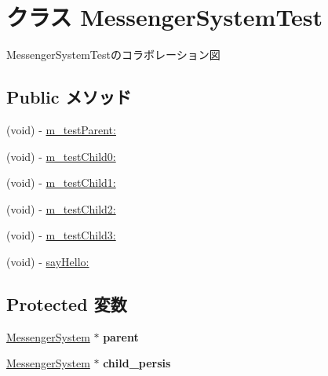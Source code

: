 \hypertarget{interface_messenger_system_test}{
\section{クラス MessengerSystemTest}
\label{d9/d39/interface_messenger_system_test}
}


MessengerSystemTestのコラボレーション図
\subsection*{Public メソッド}
\begin{DoxyCompactItemize}
\item 
(void) -\/ \hyperlink{interface_messenger_system_test_ac0b879fa2580ba6ae8e38655e6dfe838}{m\_\-testParent:}
\item 
(void) -\/ \hyperlink{interface_messenger_system_test_ab2b931ec9d4901e4fd60204e53fc61e7}{m\_\-testChild0:}
\item 
(void) -\/ \hyperlink{interface_messenger_system_test_aa3be3d8e130514372c9f750349b09a6b}{m\_\-testChild1:}
\item 
(void) -\/ \hyperlink{interface_messenger_system_test_a213b69ccc26d68c90b5455e15a7d6f36}{m\_\-testChild2:}
\item 
(void) -\/ \hyperlink{interface_messenger_system_test_ae378e9658aad05348adabeaeb1bf5b8b}{m\_\-testChild3:}
\item 
(void) -\/ \hyperlink{interface_messenger_system_test_aa6fd027edc00a037b30c04fbd581d151}{sayHello:}
\end{DoxyCompactItemize}
\subsection*{Protected 変数}
\begin{DoxyCompactItemize}
\item 
\hypertarget{interface_messenger_system_test_a57f49a12dbb0f4646ce7fa967b75bb1d}{
\hyperlink{interface_messenger_system}{MessengerSystem} $\ast$ {\bfseries parent}}
\label{d9/d39/interface_messenger_system_test_a57f49a12dbb0f4646ce7fa967b75bb1d}

\item 
\hypertarget{interface_messenger_system_test_a1ca38f6c6413aad838893e66b4bf79be}{
\hyperlink{interface_messenger_system}{MessengerSystem} $\ast$ {\bfseries child\_\-persis}}
\label{d9/d39/interface_messenger_system_test_a1ca38f6c6413aad838893e66b4bf79be}

\end{DoxyCompactItemize}


